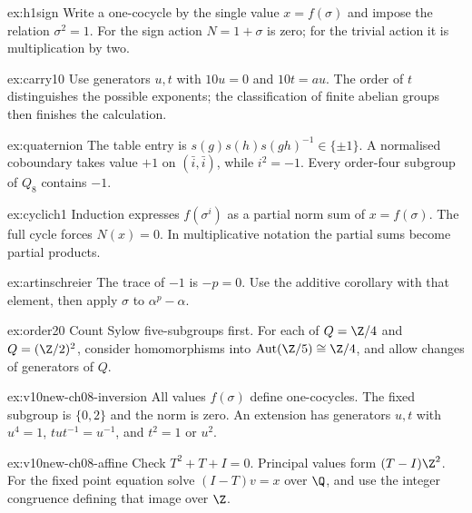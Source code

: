 \begin{hint}{ex:h1sign}
Write a one-cocycle by the single value $x=f(\sigma)$ and impose the relation $\sigma^2=1$. For the sign action $N=1+\sigma$ is zero; for the trivial action it is multiplication by two.
\end{hint}

\begin{hint}{ex:carry10}
Use generators $u,t$ with $10u=0$ and $10t=au$. The order of $t$ distinguishes the possible exponents; the classification of finite abelian groups then finishes the calculation.
\end{hint}

\begin{hint}{ex:quaternion}
The table entry is $s(g)s(h)s(gh)^{-1}\in\{\pm1\}$. A normalised coboundary takes value $+1$ on $(\bar i,\bar i)$, while $i^2=-1$. Every order-four subgroup of $Q_8$ contains $-1$.
\end{hint}

\begin{hint}{ex:cyclich1}
Induction expresses $f(\sigma^i)$ as a partial norm sum of $x=f(\sigma)$. The full cycle forces $N(x)=0$. In multiplicative notation the partial sums become partial products.
\end{hint}

\begin{hint}{ex:artinschreier}
The trace of $-1$ is $-p=0$. Use the additive corollary with that element, then apply $\sigma$ to $\alpha^p-\alpha$.
\end{hint}

\begin{hint}{ex:order20}
Count Sylow five-subgroups first. For each of $Q=\Z/4$ and $Q=(\Z/2)^2$, consider homomorphisms into
$\operatorname{Aut}(\Z/5)\cong\Z/4$, and allow changes of generators of $Q$.
\end{hint}

\begin{hint}{ex:v10new-ch08-inversion}
All values $f(\sigma)$ define one-cocycles. The fixed subgroup is $\{0,2\}$ and the norm is zero. An extension has generators $u,t$ with $u^4=1$, $tut^{-1}=u^{-1}$, and $t^2=1$ or $u^2$.
\end{hint}

\begin{hint}{ex:v10new-ch08-affine}
Check $T^2+T+I=0$. Principal values form $(T-I)\Z^2$. For the fixed point equation solve $(I-T)v=x$ over $\Q$, and use the integer congruence defining that image over $\Z$.
\end{hint}

